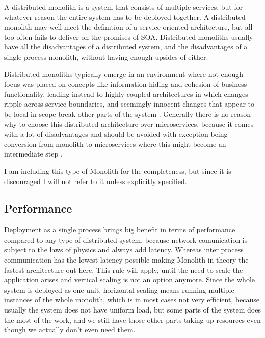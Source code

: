 A distributed monolith is a system that consists of multiple services, but for whatever reason the entire system has to be deployed together. A distributed monolith may well meet the definition of a service-oriented architecture, but all too often fails to deliver on the promises of SOA. Distributed monoliths usually have all the disadvantages of a distributed system, and the disadvantages of a single-process monolith, without having enough upsides of either. \cite{MON_TO_MS_MONOLITH}

Distributed monoliths typically emerge in an environment where not enough focus was placed on concepts like information hiding and cohesion of business functionality, leading instead to highly coupled architectures in which changes ripple across service boundaries, and seemingly innocent changes that appear to be local in scope break other parts of the system \cite{MON_TO_MS_MONOLITH}. Generally there is no reason why to choose this distributed architecture over microservices, because it comes with a lot of disadvantages and should be avoided with exception being conversion from monolith to microservices where this might become an intermediate step \cite{DIST_MON_WHICH_BUILDING}.

I am including this type of Monolith for the completeness, but since it is discouraged I will not refer to it unless explicitly specified.





\subsection{Performance}
Deployment as a single process brings big benefit in terms of performance compared to any type of distributed system, because network comunication is subject to the laws of physics and always add latency. Whereas inter process communication has the lowest latency possible making Monolith in theory the fastest architecture out here. This rule will apply, until the need to scale the application arises and vertical scaling is not an option anymore. Since the whole system is deployed as one unit, horizontal scaling means running multiple instances of the whole monolith, which is in most cases not very efficient, because usually the system does not have uniform load, but some parts of the system does the most of the work, and we still have those other parts taking up resources even though we actually don't even need them.


